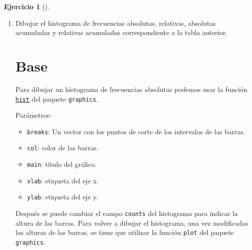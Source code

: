 \documentclass[
  a4paper,
]{scrreport}
\newenvironment{Shaded}{\begin{snugshade}}{\end{snugshade}}
\newcommand{\AttributeTok}[1]{\textcolor[rgb]{0.40,0.45,0.13}{#1}}
\newcommand{\CommentTok}[1]{\textcolor[rgb]{0.37,0.37,0.37}{#1}}
\newcommand{\DecValTok}[1]{\textcolor[rgb]{0.68,0.00,0.00}{#1}}
\newcommand{\FunctionTok}[1]{\textcolor[rgb]{0.28,0.35,0.67}{#1}}
\newcommand{\NormalTok}[1]{\textcolor[rgb]{0.00,0.23,0.31}{#1}}
\newcommand{\OtherTok}[1]{\textcolor[rgb]{0.00,0.23,0.31}{#1}}
\newcommand{\SpecialCharTok}[1]{\textcolor[rgb]{0.37,0.37,0.37}{#1}}
\newcommand{\StringTok}[1]{\textcolor[rgb]{0.13,0.47,0.30}{#1}}
\providecommand{\tightlist}{%
  \setlength{\itemsep}{0pt}\setlength{\parskip}{0pt}}\usepackage{longtable,booktabs,array}
\theoremstyle{definition}
\newtheorem{exercise}{Ejercicio}[chapter]
\theoremstyle{remark}
\begin{document}
\begin{exercise}[]
\begin{enumerate}
\begin{tcolorbox}
  \end{tcolorbox}
\item
  Dibujar el histograma de frecuencias absolutas, relativas, absolutas
  acumuladas y relativas acumuladas correspondiente a la tabla anterior.

  \begin{tcolorbox}[enhanced jigsaw, colframe=quarto-callout-tip-color-frame, toprule=.15mm, bottomtitle=1mm, breakable, opacitybacktitle=0.6, toptitle=1mm, colback=white, bottomrule=.15mm, title=\textcolor{quarto-callout-tip-color}{\faLightbulb}\hspace{0.5em}{Solución}, arc=.35mm, left=2mm, titlerule=0mm, rightrule=.15mm, coltitle=black, leftrule=.75mm, opacityback=0, colbacktitle=quarto-callout-tip-color!10!white]

  \section{Base}

  Para dibujar un histograma de frecuencias absolutas podemos usar la
  función
  \href{https://www.rdocumentation.org/packages/graphics/versions/3.6.2/topics/hist}{\texttt{hist}}
  del paquete \texttt{graphics}.

  Parámetros:

  \begin{itemize}
  \tightlist
  \item
    \texttt{breaks}: Un vector con los puntos de corte de los intervalos
    de las barras.
  \item
    \texttt{col}: color de las barras.
  \item
    \texttt{main}: título del gráfico.
  \item
    \texttt{xlab}: etiqueta del eje x.
  \item
    \texttt{ylab}: etiqueta del eje y.
  \end{itemize}

  Después se puede cambiar el campo \texttt{counts} del histograma para
  indicar la altura de las barras. Para volver a dibujar el histograma,
  una vez modificadas las alturas de las barras, se tiene que utilizar
  la función \texttt{plot} del paquete \texttt{graphics}.

\begin{Shaded}
\end{Shaded}


\end{tcolorbox}
\end{enumerate}
\end{exercise}
\end{document}
